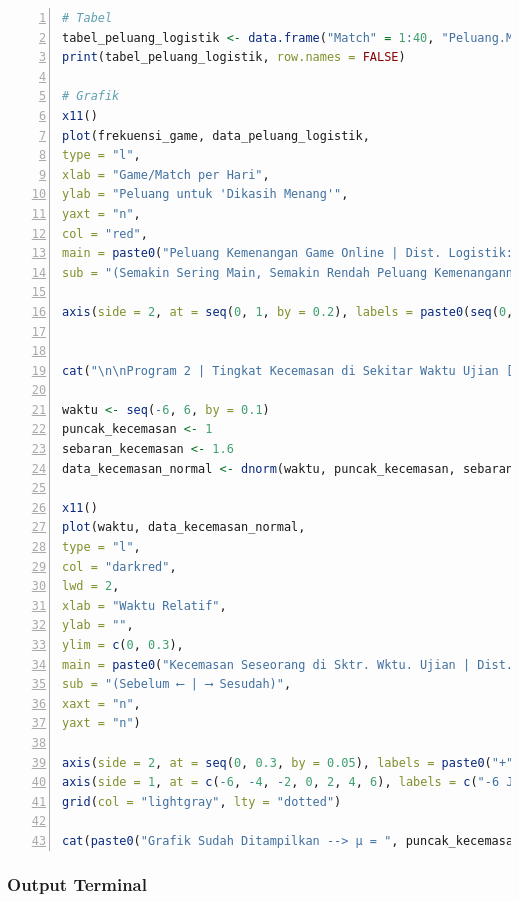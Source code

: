 \begin{lstlisting}[language=R, numbers=left, basicstyle=\small\ttfamily]
# Tabel
tabel_peluang_logistik <- data.frame("Match" = 1:40, "Peluang.Menang" = paste0(abs(round(1 - plogis(40:1, peluang_tengah, scale) * 100, 2)), "%"))
print(tabel_peluang_logistik, row.names = FALSE)

# Grafik
x11()
plot(frekuensi_game, data_peluang_logistik,
type = "l",
xlab = "Game/Match per Hari",
ylab = "Peluang untuk 'Dikasih Menang'",
yaxt = "n",
col = "red",
main = paste0("Peluang Kemenangan Game Online | Dist. Logistik: μ = ", peluang_tengah, ", 𝒔 = ", scale),
sub = "(Semakin Sering Main, Semakin Rendah Peluang Kemenangannya)")

axis(side = 2, at = seq(0, 1, by = 0.2), labels = paste0(seq(0, 1, by = 0.2) * 100, "%"), las = 1)


cat("\n\nProgram 2 | Tingkat Kecemasan di Sekitar Waktu Ujian [Distribusi Normal]\n\n")

waktu <- seq(-6, 6, by = 0.1)
puncak_kecemasan <- 1
sebaran_kecemasan <- 1.6
data_kecemasan_normal <- dnorm(waktu, puncak_kecemasan, sebaran_kecemasan)

x11()
plot(waktu, data_kecemasan_normal,
type = "l",
col = "darkred",
lwd = 2,
xlab = "Waktu Relatif",
ylab = "",
ylim = c(0, 0.3),
main = paste0("Kecemasan Seseorang di Sktr. Wktu. Ujian | Dist. Normal: μ = ", puncak_kecemasan, ", σ = ", sebaran_kecemasan),
sub = "(Sebelum ⟵ | ⟶ Sesudah)",
xaxt = "n",
yaxt = "n")

axis(side = 2, at = seq(0, 0.3, by = 0.05), labels = paste0("+", seq(0, 0.3, by = 0.05) * 100, "%"), las = 1)
axis(side = 1, at = c(-6, -4, -2, 0, 2, 4, 6), labels = c("-6 Jam", "-4 Jam", "-2 Jam", "Ujian Mulai", "+2 Jam", "+4 Jam", "+6 Jam"), las = 1)
grid(col = "lightgray", lty = "dotted")

cat(paste0("Grafik Sudah Ditampilkan --> μ = ", puncak_kecemasan, ", σ = ", sebaran_kecemasan, "\n\n"))

\end{lstlisting}

\subsubsection{Output Terminal}

